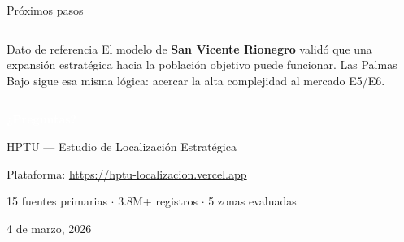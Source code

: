 \documentclass[aspectratio=169, 11pt]{beamer}
\begin{document}
\begin{frame}{Próximos pasos}
\begin{columns}[T]
\vspace{8pt}
\begin{exampleblock}{\small Dato de referencia}
\small El modelo de \textbf{San Vicente Rionegro} validó que una expansión estratégica hacia la población objetivo puede funcionar. Las Palmas Bajo sigue esa misma lógica: acercar la alta complejidad al mercado E5/E6.
\end{exampleblock}
\end{columns}
\end{frame}

{
\begin{frame}[plain]
\vfill
\begin{center}
{\Huge\bfseries\textcolor{white}{¿Preguntas?}}

\vspace{20pt}

\vspace{16pt}
{\large\textcolor{white!90}{HPTU — Estudio de Localización Estratégica}}

\vspace{10pt}
{\small\textcolor{white!70}{Plataforma: \url{https://hptu-localizacion.vercel.app}}}

\vspace{6pt}
{\small\textcolor{white!70}{15 fuentes primarias $\cdot$ 3.8M+ registros $\cdot$ 5 zonas evaluadas}}

\vspace{20pt}
{\footnotesize\textcolor{white!50}{4 de marzo, 2026}}
\end{center}
\vfill
\end{frame}
}
\end{document}
